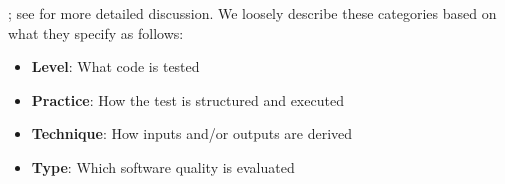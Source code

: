     ; see  for more detailed discussion\fi.
We loosely describe these categories based on what they specify
as follows: %
\begin{itemize}
    \item \textbf{Level}: What code is tested
    \item \textbf{Practice}: How the test is structured and executed
    \item \textbf{Technique}: How inputs and/or outputs are derived
    \item \textbf{Type}: Which software quality is evaluated
\end{itemize}



